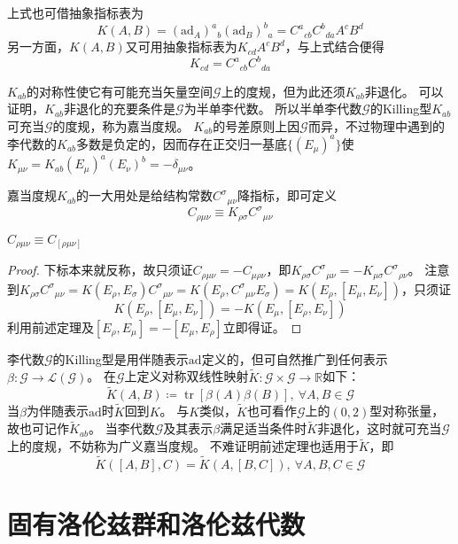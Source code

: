 上式也可借抽象指标表为
$$K(A, B) = (\mathrm{ad}_A)^a{}_b(\mathrm{ad}_B)^b{}_a = C^a{}_{cb}C^b{}_{da}A^cB^d$$
另一方面，$K(A, B)$又可用抽象指标表为$K_{cd}A^cB^d$，与上式结合便得
$$K_{cd} = C^a{}_{cb}C^b{}_{da}$$

$K_{ab}$的对称性使它有可能充当矢量空间$\mathscr{G}$上的度规，但为此还须$K_{ab}$非退化。
可以证明，$K_{ab}$非退化的充要条件是$\mathscr{G}$为半单李代数。
所以半单李代数$\mathscr{G}$的Killing型$K_{ab}$可充当$\mathscr{G}$的度规，称为嘉当度规。
$K_{ab}$的号差原则上因$\mathscr{G}$而异，不过物理中遇到的李代数的$K_{ab}$多数是负定的，因而存在正交归一基底$\{(E_\mu)^a\}$使$K_{\mu\nu} = K_{ab}(E_\mu)^a(E_\nu)^b = -\delta_{\mu\nu}$。

嘉当度规$K_{ab}$的一大用处是给结构常数$C^\sigma{}_{\mu\nu}$降指标，即可定义
$$C_{\rho\mu\nu} \equiv K_{\rho\sigma}C^\sigma{}_{\mu\nu}$$

\begin{theorem}
    $C_{\rho\mu\nu} \equiv C_{[\rho\mu\nu]}$
\end{theorem}

\begin{proof}
    下标本来就反称，故只须证$C_{\rho\mu\nu} = -C_{\mu\rho\nu}$，即$K_{\rho\sigma}C^\sigma{}_{\mu\nu} = -K_{\mu\sigma}C^\sigma{}_{\rho\nu}$。
    注意到$K_{\rho\sigma}C^\sigma{}_{\mu\nu} = K(E_\rho, E_\sigma)C^\sigma{}_{\mu\nu} = K(E_\rho, C^\sigma{}_{\mu\nu}E_\sigma) = K(E_\rho, [E_\mu, E_\nu])$，只须证
    $$K(E_\rho, [E_\mu, E_\nu]) = -K(E_\mu, [E_\rho, E_\nu])$$
    利用前述定理及$[E_\rho, E_\mu] = -[E_\mu, E_\rho]$立即得证。
\end{proof}

李代数$\mathscr{G}$的Killing型是用伴随表示$\mathrm{ad}$定义的，但可自然推广到任何表示$\beta \colon \mathscr{G} \to \mathscr{L}(\mathscr{G})$。
在$\mathscr{G}$上定义对称双线性映射$\tilde K \colon \mathscr{G} \times \mathscr{G} \to \mathbb{R}$如下：
$$\tilde K(A, B) \coloneq \operatorname{tr}[\beta(A)\beta(B)], ~ \forall A, B \in \mathscr{G}$$
当$\beta$为伴随表示$\mathrm{ad}$时$\tilde K$回到$K$。
与$K$类似，$\tilde K$也可看作$\mathscr{G}$上的$(0, 2)$型对称张量，故也可记作$\tilde K_{ab}$。
当李代数$\mathscr{G}$及其表示$\beta$满足适当条件时$\tilde K$非退化，这时就可充当$\mathscr{G}$上的度规，不妨称为广义嘉当度规。
不难证明前述定理也适用于$\tilde K$，即
$$\tilde K([A, B], C) = \tilde K(A, [B, C]), ~ \forall A, B, C \in \mathscr{G}$$

\iffalse

\section{固有洛伦兹群和洛伦兹代数}

